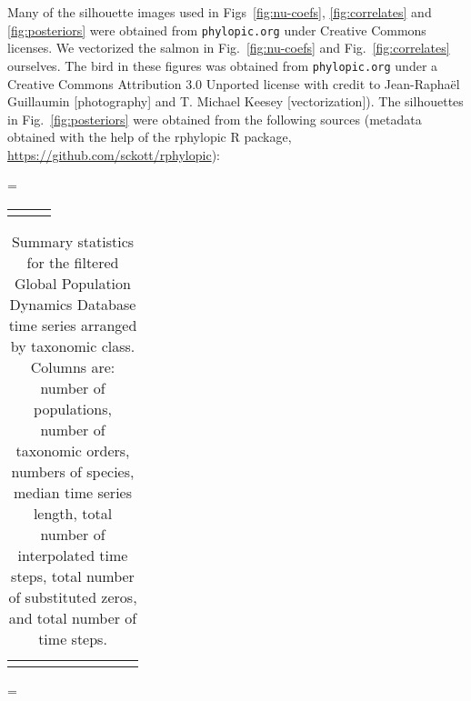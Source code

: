 Many of the silhouette images used in Figs~\ref{fig:nu-coefs}, \ref{fig:correlates} and \ref{fig:posteriors} were obtained from \texttt{phylopic.org} under Creative Commons licenses. We vectorized the salmon in Fig.~\ref{fig:nu-coefs} and Fig.~\ref{fig:correlates} ourselves. The bird in these figures was obtained from \texttt{phylopic.org} under a Creative Commons Attribution 3.0 Unported license with credit to Jean-Raphaël Guillaumin {[}photography{]} and T. Michael Keesey {[}vectorization{]}). The silhouettes in Fig.~\ref{fig:posteriors} were obtained from the following sources (metadata obtained with the help of the rphylopic R package, \url{https://github.com/sckott/rphylopic}):

\LTcapwidth=\textwidth
\singlespacing
\begin{footnotesize}
\begin{longtable}{>{\RaggedRight}m{3.2cm}>{\RaggedRight}p{6.5cm}>{\RaggedRight}p{5.0cm}}
\toprule

\label{tab:phylopic}
\end{longtable}
\end{footnotesize}
\onehalfspacing






\clearpage
\renewcommand{\thetable}{S\arabic{table}}
\setcounter{table}{0}


\begin{table}
\begin{footnotesize}
\caption{Summary statistics for the filtered Global Population Dynamics Database time series arranged by taxonomic class. Columns are: number of populations, number of taxonomic orders, numbers of species, median time series length, total number of interpolated time steps, total number of substituted zeros, and total number of time steps.}
\smallskip
\begin{tabular}{lrrrrrrrr}
\toprule

\label{tab:stats}
\end{tabular}
\end{footnotesize}
\end{table}

\clearpage

\LTcapwidth=\textwidth
{}

